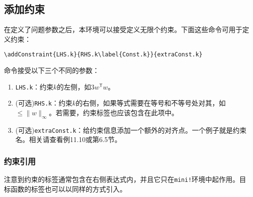 \documentclass[UTF8]{ctexart}
\begin{document}
\subsection{添加约束}
在定义了问题参数之后，本环境可以接受定义无限个约束。下面这些命令可用于定义约束：
\begin{verbatim}
\addConstraint{LHS.k}{RHS.k\label{Const.k}}{extraConst.k}
\end{verbatim}

命令接受以下三个不同的参数：
\begin{enumerate}
\item \texttt{LHS.k}：约束$k$的左侧，如$3w^\mathsf{T}w$。
\item (可选)\texttt{RHS.k\label{Const.k}}：约束$k$的右侧，如果等式需要在等号和不等号处对其，如$\leq\|w\|_\infty$。若需要，约束标签也应该包含在此项中。
\item (可选)\texttt{extraConst.k}：给约束信息添加一个额外的对齐点。一个例子就是约束名。相关请查看例11.10或第6.5节。
\end{enumerate}
\subsubsection{约束引用}
注意到约束的标签通常包含在右侧表达式内，并且它只在\texttt{mini!}环境中起作用。目标函数的标签也可以以同样的方式引入。
\end{document}
